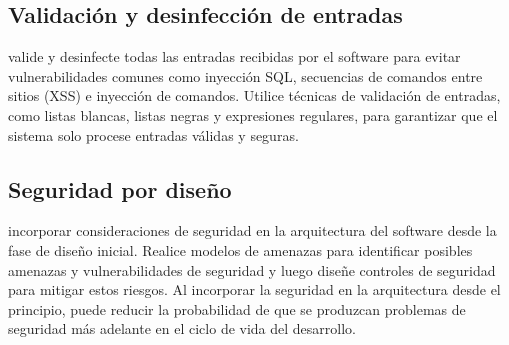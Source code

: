 \documentclass{article}
\begin{document}
\subsection{Validación y desinfección de entradas}
valide y desinfecte todas las entradas recibidas por el software para evitar vulnerabilidades comunes como inyección SQL, secuencias de comandos entre sitios (XSS) e inyección de comandos. Utilice técnicas de validación de entradas, como listas blancas, listas negras y expresiones regulares, para garantizar que el sistema solo procese entradas válidas y seguras.
\subsection{Seguridad por diseño}
incorporar consideraciones de seguridad en la arquitectura del software desde la fase de diseño inicial. Realice modelos de amenazas para identificar posibles amenazas y vulnerabilidades de seguridad y luego diseñe controles de seguridad para mitigar estos riesgos. Al incorporar la seguridad en la arquitectura desde el principio, puede reducir la probabilidad de que se produzcan problemas de seguridad más adelante en el ciclo de vida del desarrollo.
\end{document}

